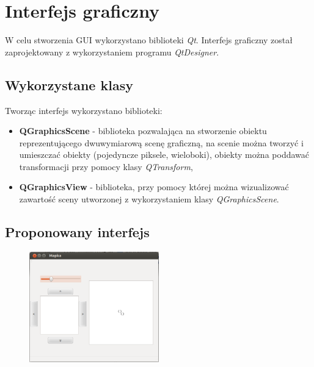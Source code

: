 \section{Interfejs graficzny}
W celu stworzenia GUI wykorzystano biblioteki \textit{Qt}. Interfejs graficzny został zaprojektowany z wykorzystaniem programu \textit{QtDesigner}.

\subsection{Wykorzystane klasy}
Tworząc interfejs wykorzystano biblioteki:

\begin{itemize}
\item \textbf{QGraphicsScene} - biblioteka pozwalająca na stworzenie obiektu reprezentującego dwuwymiarową scenę graficzną, na scenie można tworzyć i umieszczać obiekty (pojedyncze piksele, wieloboki), obiekty można poddawać transformacji przy pomocy klasy \textit{QTransform},
\item \textbf{QGraphicsView} - biblioteka, przy pomocy której można wizualizować zawartość sceny utworzonej z wykorzystaniem klasy \textit{QGraphicsScene}.
 \end{itemize}

\subsection{Proponowany interfejs}
\begin{figure}[H]
  \centering
  \includegraphics[width=0.5\textwidth]{img/okno.png}
\end{figure}
